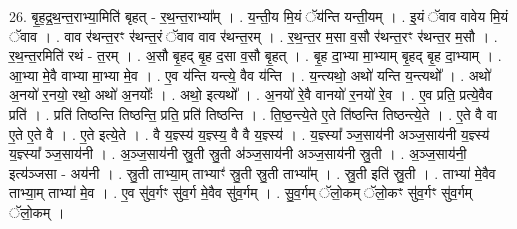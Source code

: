 \documentclass[17pt]{extarticle}
\begin{document}
26. बृ॒ह॒द्र॒थ॒न्त॒राभ्या॒मिति॑ बृहत् - र॒थ॒न्त॒राभ्या᳚म् । . य॒न्ती॒य मि॒यं ॅय॑न्ति यन्ती॒यम् । . इ॒यं ॅवाव वावेय मि॒यं ॅवाव । . वाव र॑थन्त॒रꣳ र॑थन्त॒रं ॅवाव वाव र॑थन्त॒रम् । . र॒थ॒न्त॒र म॒सा व॒सौ र॑थन्त॒रꣳ र॑थन्त॒र म॒सौ । . र॒थ॒न्त॒रमिति॑ रथं - त॒रम् । . अ॒सौ बृ॒हद् बृ॒ह द॒सा व॒सौ बृ॒हत् । . बृ॒ह दा॒भ्या मा॒भ्याम् बृ॒हद् बृ॒ह दा॒भ्याम् । . आ॒भ्या मे॒वै वाभ्या मा॒भ्या मे॒व । . ए॒व य॑न्ति यन्त्ये॒ वैव य॑न्ति । . य॒न्त्यथो॒ अथो॑ यन्ति य॒न्त्यथो᳚ । . अथो॑ अ॒नयो॑ र॒नयो॒ रथो॒ अथो॑ अ॒नयोः᳚ । . अथो॒ इत्यथो᳚ । . अ॒नयो॑ रे॒वै वानयो॑ र॒नयो॑ रे॒व । . ए॒व प्रति॒ प्रत्ये॒वैव प्रति॑ । . प्रति॑ तिष्ठन्ति तिष्ठन्ति॒ प्रति॒ प्रति॑ तिष्ठन्ति । . ति॒ष्ठ॒न्त्ये॒ते ए॒ते ति॑ष्ठन्ति तिष्ठन्त्ये॒ते । . ए॒ते वै वा ए॒ते ए॒ते वै । . ए॒ते इत्ये॒ते । . वै य॒ज्ञ्स्य॑ य॒ज्ञ्स्य॒ वै वै य॒ज्ञ्स्य॑ । . य॒ज्ञ्स्या᳚ ञ्ज॒साय॑नी अञ्ज॒साय॑नी य॒ज्ञ्स्य॑ य॒ज्ञ्स्या᳚ ञ्ज॒साय॑नी । . अ॒ञ्ज॒साय॑नी स्रु॒ती स्रु॒ती अ॑ञ्ज॒साय॑नी अञ्ज॒साय॑नी स्रु॒ती । . अ॒ञ्ज॒साय॑नी॒ इत्य॑ञ्जसा - अय॑नी । . स्रु॒ती ताभ्या॒म् ताभ्याꣳ॑ स्रु॒ती स्रु॒ती ताभ्या᳚म् । . स्रु॒ती इति॑ स्रु॒ती । . ताभ्या॑ मे॒वैव ताभ्या॒म् ताभ्या॑ मे॒व । . ए॒व सु॑व॒र्गꣳ सु॑व॒र्ग मे॒वैव सु॑व॒र्गम् । . सु॒व॒र्गम् ॅलो॒कम् ॅलो॒कꣳ सु॑व॒र्गꣳ सु॑व॒र्गम् ॅलो॒कम् । \newline
\end{document}

